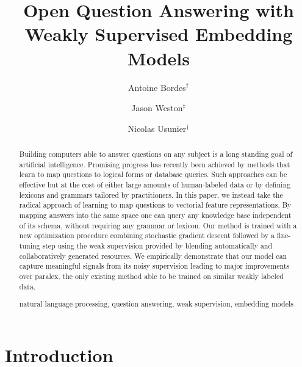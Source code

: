 \documentclass[runningheads,a4paper]{llncs}
\newcommand{\keywords}[1]{\par\addvspace\baselineskip
\noindent\keywordname\enspace\ignorespaces#1}
\begin{document}
\mainmatter  
\title{Open Question Answering  with Weakly Supervised Embedding Models}




\author{Antoine Bordes$^\dagger$
\and Jason Weston$^\ddagger$ \and Nicolas Usunier$^\dagger$}



\maketitle


\begin{abstract}
Building computers able to answer questions on any subject is a long standing goal of artificial intelligence.
Promising progress has recently been achieved by methods that learn to map questions to logical forms or database queries.
Such approaches can be effective but at the cost of 
either large amounts of human-labeled data or by 
defining lexicons and grammars tailored by practitioners.
In this paper, we instead take the radical approach of learning to map questions to vectorial feature representations. By mapping answers into the same space one can query any knowledge base 
independent of its schema, without requiring any grammar or lexicon.
Our method is trained with a new optimization procedure combining stochastic gradient descent followed by a fine-tuning step using the weak supervision provided by blending automatically and collaboratively generated resources.
We empirically demonstrate that our model can capture meaningful signals from its noisy supervision leading to major improvements over {\sc paralex}, the only existing method able to be trained 
on similar weakly labeled data.
\keywords{natural language processing, question answering, weak supervision, embedding models}
\end{abstract}


\section{Introduction}
\label{sec:intro}
\end{document}
